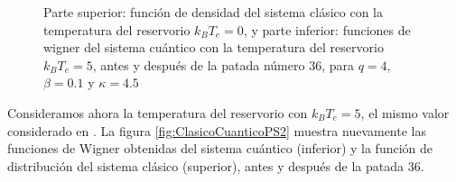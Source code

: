 \documentclass[letterpaper,12pt,oneside]{book}
\begin{document}
\begin{figure}
\begin{minipage}{0.45\textwidth}
		
	\end{minipage}
	\caption{Parte superior: función de densidad del sistema clásico con la temperatura del reservorio $k_BT_e = 0$, y parte inferior: funciones de wigner del sistema cuántico con la temperatura del reservorio $k_BT_e = 5$, antes y después de la patada número 36, para $q=4$, $\beta = 0.1$ y  $\kappa=4.5$}
	
	\label{fig:ClasicoCuanticoPS}
\end{figure}


Consideramos ahora la temperatura del reservorio con $k_BT_e = 5$, el mismo valor considerado en \cite{ArticuloPrado}. La figura \ref{fig:ClasicoCuanticoPS2} muestra nuevamente las funciones de Wigner obtenidas del sistema cuántico (inferior) y la función de distribución del sistema clásico (superior), antes y después de la patada 36.
\end{document}
